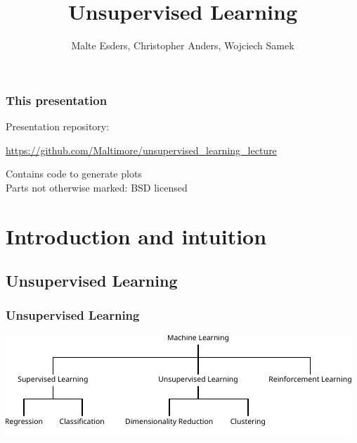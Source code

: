\documentclass[Nike]{tuberlinbeamer}
\title{Unsupervised Learning}
\author{Malte Esders, Christopher Anders, Wojciech Samek}
\institute{Technische Universität Berlin - Machine Learning Group}
\begin{document}
\frame{\titlepage}


\begin{frame}
  \frametitle{This presentation}
  Presentation repository: \\
  \begin{center}
    \url{https://github.com/Maltimore/unsupervised_learning_lecture}\\
  \end{center}
  Contains code to generate plots\\
  Parts not otherwise marked: BSD licensed
\end{frame}


\section{Introduction and intuition}
\subsection{Unsupervised Learning}

\begin{frame}
 \frametitle{Unsupervised Learning}
  \begin{center}
    \vfill
    \includegraphics[width=\textwidth]{ml_schema}
    \vfill
  \end{center}
\end{frame}
\end{document}
